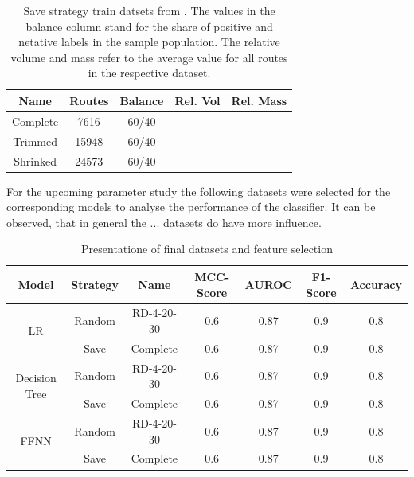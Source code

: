 \begin{table}[ht]
    \centering
    \begin{tabular}{c c c c c}
        \toprule
        Name     & Routes & Balance & Rel. Vol & Rel. Mass \\
        \midrule
        Complete & 7616   & 60/40   &          &           \\
        Trimmed  & 15948  & 60/40   &          &           \\
        Shrinked & 24573  & 60/40   &          &           \\
        \bottomrule
    \end{tabular}
    \caption[Save strategy train datsets from \gendreauDataSetText.]{Save strategy train datsets from \gendreauDataSetText.
        The values in the balance column stand for the share of positive and netative labels in the sample population. The relative volume
        and mass refer to the average value for all routes in the respective dataset.}
    \label{tab:saved_instances_gendreau}
\end{table}

For the upcoming parameter study the following datasets were selected for the corresponding models
to analyse the performance of the classifier. It can be observed, that in general the ... datasets
do have more influence.

\begin{table}[ht]
    \centering
    \begin{tabular}{c c c c c c c}
        \toprule
        Model                          & Strategy & Name       & \gls{MCC}-Score & \gls{AUROC} & F1-Score & Accuracy \\
        \midrule
        \multirow{2}{*}{\gls{LR}}      & Random   & RD-4-20-30 & 0.6             & 0.87        & 0.9      & 0.8      \\
                                       & Save     & Complete   & 0.6             & 0.87        & 0.9      & 0.8      \\
        \midrule
        \multirow{2}{*}{Decision Tree} & Random   & RD-4-20-30 & 0.6             & 0.87        & 0.9      & 0.8      \\
                                       & Save     & Complete   & 0.6             & 0.87        & 0.9      & 0.8      \\
        \midrule
        \multirow{2}{*}{\gls{FFNN}}    & Random   & RD-4-20-30 & 0.6             & 0.87        & 0.9      & 0.8      \\
                                       & Save     & Complete   & 0.6             & 0.87        & 0.9      & 0.8      \\

        \bottomrule
    \end{tabular}
    \caption{Presentatione of final datasets and feature selection}
    \label{tab:final_dataset_features}
\end{table}

